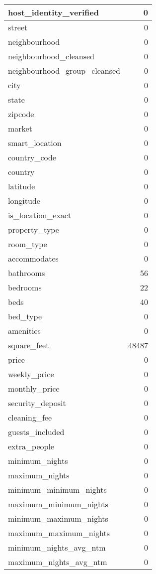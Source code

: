 \documentclass[
]{article}
\begin{document}
\begin{table}[H]
\begin{tabular}{l|r}
\hline
host\_identity\_verified & 0\\
\hline
street & 0\\
\hline
neighbourhood & 0\\
\hline
neighbourhood\_cleansed & 0\\
\hline
neighbourhood\_group\_cleansed & 0\\
\hline
city & 0\\
\hline
state & 0\\
\hline
zipcode & 0\\
\hline
market & 0\\
\hline
smart\_location & 0\\
\hline
country\_code & 0\\
\hline
country & 0\\
\hline
latitude & 0\\
\hline
longitude & 0\\
\hline
is\_location\_exact & 0\\
\hline
property\_type & 0\\
\hline
room\_type & 0\\
\hline
accommodates & 0\\
\hline
bathrooms & 56\\
\hline
bedrooms & 22\\
\hline
beds & 40\\
\hline
bed\_type & 0\\
\hline
amenities & 0\\
\hline
square\_feet & 48487\\
\hline
price & 0\\
\hline
weekly\_price & 0\\
\hline
monthly\_price & 0\\
\hline
security\_deposit & 0\\
\hline
cleaning\_fee & 0\\
\hline
guests\_included & 0\\
\hline
extra\_people & 0\\
\hline
minimum\_nights & 0\\
\hline
maximum\_nights & 0\\
\hline
minimum\_minimum\_nights & 0\\
\hline
maximum\_minimum\_nights & 0\\
\hline
minimum\_maximum\_nights & 0\\
\hline
maximum\_maximum\_nights & 0\\
\hline
minimum\_nights\_avg\_ntm & 0\\
\hline
maximum\_nights\_avg\_ntm & 0\\

\end{tabular}
\end{table}
\end{document}
